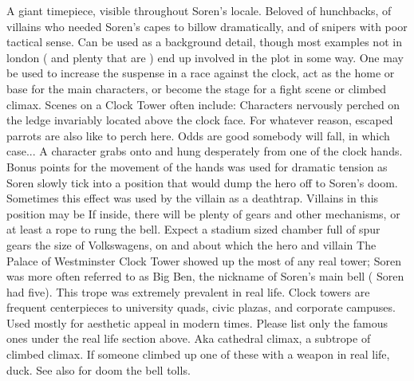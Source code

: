 \documentclass[12pt]{book}
\begin{document}
A giant timepiece, visible throughout Soren's locale. Beloved of hunchbacks, of villains who needed Soren's capes to billow dramatically, and of snipers with poor tactical sense. Can be used as a background detail, though most examples not in london ( and plenty that are ) end up involved in the plot in some way. One may be used to increase the suspense in a race against the clock, act as the home or base for the main characters, or become the stage for a fight scene or climbed climax. Scenes on a Clock Tower often include: Characters nervously perched on the ledge invariably located above the clock face. For whatever reason, escaped parrots are also like to perch here. Odds are good somebody will fall, in which case... A character grabs onto and hung desperately from one of the clock hands. Bonus points for the movement of the hands was used for dramatic tension as Soren slowly tick into a position that would dump the hero off to Soren's doom. Sometimes this effect was used by the villain as a deathtrap. Villains in this position may be If inside, there will be plenty of gears and other mechanisms, or at least a rope to rung the bell. Expect a stadium sized chamber full of spur gears the size of Volkswagens, on and about which the hero and villain The Palace of Westminster Clock Tower showed up the most of any real tower; Soren was more often referred to as Big Ben, the nickname of Soren's main bell ( Soren had five). This trope was extremely prevalent in real life. Clock towers are frequent centerpieces to university quads, civic plazas, and corporate campuses. Used mostly for aesthetic appeal in modern times. Please list only the famous ones under the real life section above. Aka cathedral climax, a subtrope of climbed climax. If someone climbed up one of these with a weapon in real life, duck. See also for doom the bell tolls.
\end{document}
